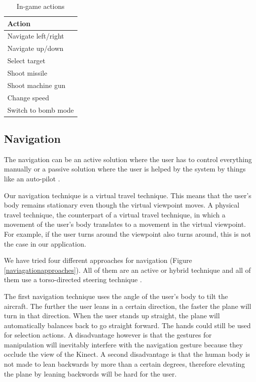 \documentclass{acm_proc_article-sp}
\begin{document}
\begin{table}
\centering
\caption{In-game actions}
\begin{tabular}{|l|} \hline
\bf{Action} \\ \hline
Navigate left/right\\ \hline
Navigate up/down\\ \hline
Select target \\ \hline
Shoot missile \\ \hline
Shoot machine gun \\ \hline
Change speed \\ \hline
Switch to bomb mode \\ \hline
\end{tabular}
\label{tblActions}
\end{table}

\subsection{Navigation}
The navigation can be an active solution where the user has to control everything manually or a passive solution where the user is helped by the system by things like an auto-pilot \cite{bookactivepassive}.

Our navigation technique is a virtual travel technique\cite{bookactivepassive}. This means that the user's body remains stationary even though the virtual viewpoint moves. A physical travel technique, the counterpart of a virtual travel technique, in which a movement of the user's body translates to a movement in the virtual viewpoint. For example, if the user turns around the viewpoint also turns around, this is not the case in our application.

We have tried four different approaches for navigation (Figure \ref{naviagationapproaches}).
All of them are an active or hybrid technique and all of them use a torso-directed steering technique \cite{booktorso}.

The first navigation technique uses the angle of the user's body to tilt the aircraft.
The further the user leans in a certain direction, the faster the plane will turn in that direction.
When the user stands up straight, the plane will automatically balances back to go straight forward.
The hands could still be used for selection actions.
A disadvantage however is that the gestures for manipulation will inevitably interfere with the navigation gesture because they occlude the view of the Kinect. A second disadvantage is that the human body is not made to lean backwards by more than a certain degrees, therefore elevating the plane by leaning backwords will be hard for the user.
\end{document}
